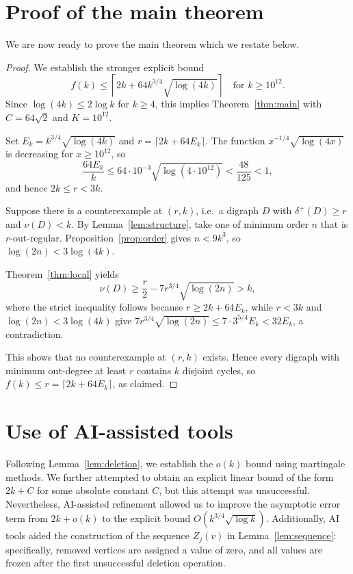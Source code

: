 \documentclass[10pt,a4paper]{article}
\numberwithin{equation}{section}
\begin{document}


\section{Proof of the main theorem}\label{sec:mainproof}

We are now ready to prove the main theorem which we restate below.

\MainThm*
\begin{proof}
We establish the stronger explicit bound
$$
f(k)\le\left\lceil2k+64k^{3/4}\sqrt{\log(4k)}\right\rceil
\quad\text{for }k\ge10^{12}.
$$
Since $\log(4k)\le2\log k$ for $k\ge4$, this implies
Theorem~\ref{thm:main} with $C=64\sqrt2$ and $K=10^{12}$.

Set $E_k=k^{3/4}\sqrt{\log(4k)}$ and $r=\lceil2k+64E_k\rceil$.
The function $x^{-1/4}\sqrt{\log(4x)}$ is decreasing for $x\ge10^{12}$, so
$$
\frac{64E_k}{k}\le64\cdot10^{-3}\sqrt{\log(4\cdot10^{12})}<\frac{48}{125}<1,
$$
and hence $2k\le r<3k$.

Suppose there is a counterexample at $(r,k)$,
i.e.\ a digraph $D$ with $\delta^+(D)\ge r$ and $\nu(D)<k$. By
Lemma~\ref{lem:structure}, take one of minimum order $n$ that is
$r$-out-regular. Proposition~\ref{prop:order} gives $n<9k^3$, so
$\log(2n)<3\log(4k)$.

Theorem~\ref{thm:local} yields
$$
\nu(D)\ge\frac r2-7r^{3/4}\sqrt{\log(2n)}>k,
$$
where the strict inequality follows because $r\ge2k+64E_k$, while
$r<3k$ and $\log(2n)<3\log(4k)$ give
$7r^{3/4}\sqrt{\log(2n)}\le7\cdot3^{5/4}E_k<32E_k$, a contradiction.

This shows that no counterexample at $(r,k)$ exists. Hence every
digraph with minimum out-degree at least $r$ contains $k$ disjoint
cycles, so $f(k)\le r=\lceil2k+64E_k\rceil$, as claimed.
\end{proof}



\section*{Use of AI-assisted tools} 

Following Lemma~\ref{lem:deletion}, we establish the $o(k)$ bound using martingale methods. We further attempted to obtain an explicit linear bound of the form $2k+C$ for some absolute constant $C$, but this attempt was unsuccessful. Nevertheless, AI-assisted refinement allowed us to improve the asymptotic error term from $2k+o(k)$ to the explicit bound $O(k^{3/4}\sqrt{\log k})$. Additionally, AI tools aided the construction of the sequence $Z_j(v)$ in Lemma~\ref{lem:sequence}: specifically, removed vertices are assigned a value of zero, and all values are frozen after the first unsuccessful deletion operation.
\end{document}
